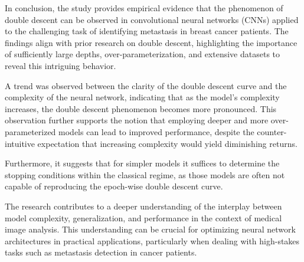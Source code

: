 In conclusion, the study provides empirical evidence that the phenomenon of double descent can be observed in convolutional neural networks (CNNs) applied to the challenging task of identifying metastasis in breast cancer patients. The findings align with prior research on double descent, highlighting the importance of sufficiently large depths, over-parameterization, and extensive datasets to reveal this intriguing behavior.

A trend was observed between the clarity of the double descent curve and the complexity of the neural network, indicating that as the model's complexity increases, the double descent phenomenon becomes more pronounced. This observation further supports the notion that employing deeper and more over-parameterized models can lead to improved performance, despite the counter-intuitive expectation that increasing complexity would yield diminishing returns.

Furthermore, it suggests that for simpler models it suffices to determine the stopping conditions within the classical regime, as those models are often not capable of reproducing the epoch-wise double descent curve.

The research contributes to a deeper understanding of the interplay between model complexity, generalization, and performance in the context of medical image analysis. This understanding can be crucial for optimizing neural network architectures in practical applications, particularly when dealing with high-stakes tasks such as metastasis detection in cancer patients.
